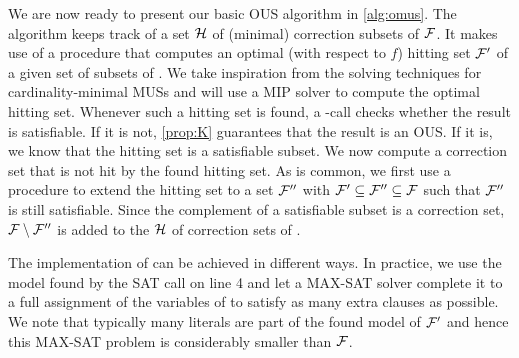 We are now ready to present our basic OUS algorithm in \cref{alg:omus}. 
The algorithm keeps track of a set $\mathcal{H}$ of (minimal) correction subsets of $\mathcal{F} $. 
It makes use of a procedure \ohs that computes an optimal (with respect to $f$) hitting set $\mathcal{F} '$  of a given set of subsets of \formula. 
We take inspiration from the \hitsetbased solving techniques for cardinality-minimal MUSs \cite{ignatiev2015smallest} and will use a MIP solver to compute the optimal hitting set.
Whenever such a hitting set is found, a \sat-call checks whether the result is satisfiable. If it is not, \cref{prop:K} guarantees that the result is an OUS. 
If it is, we know that the hitting set is a satisfiable subset. We now compute a correction set that is not hit by the found hitting set.
As is common, we first use a procedure \grow to extend the hitting set to a set $\mathcal{F} ''$ with $\mathcal{F} '\subseteq \mathcal{F} ''\subseteq\mathcal{F} $ such that $\mathcal{F} ''$ is still satisfiable. Since the complement of a satisfiable subset is a correction set, $\mathcal{F}  \setminus \mathcal{F} ''$ is added to the $\mathcal{H}$ of correction sets of \formula. 

The implementation of \grow can be achieved in different ways.
In practice, we use the model found by the SAT call on line 4 and let a MAX-SAT solver complete it to a full assignment of the variables of \formula to satisfy as many extra clauses as possible.  We note that typically many literals are part of the found model of $\mathcal{F} '$ and hence this MAX-SAT problem is considerably smaller than $\mathcal{F} $.
% 


% 


